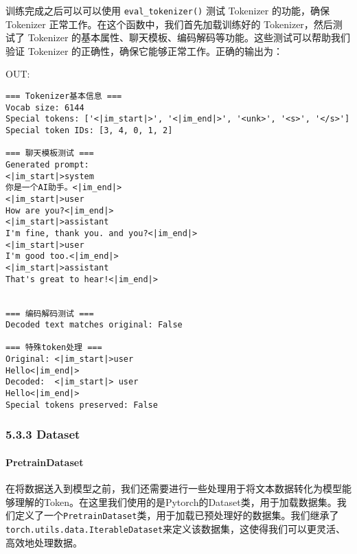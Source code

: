 \documentclass[12pt,a4paper]{book}
\begin{document}
训练完成之后可以可以使用 \texttt{eval\_tokenizer()} 测试 Tokenizer
的功能，确保 Tokenizer 正常工作。在这个函数中，我们首先加载训练好的
Tokenizer，然后测试了 Tokenizer
的基本属性、聊天模板、编码解码等功能。这些测试可以帮助我们验证 Tokenizer
的正确性，确保它能够正常工作。正确的输出为：

OUT:

\begin{verbatim}
=== Tokenizer基本信息 ===
Vocab size: 6144
Special tokens: ['<|im_start|>', '<|im_end|>', '<unk>', '<s>', '</s>']
Special token IDs: [3, 4, 0, 1, 2]

=== 聊天模板测试 ===
Generated prompt:
<|im_start|>system
你是一个AI助手。<|im_end|>
<|im_start|>user
How are you?<|im_end|>
<|im_start|>assistant
I'm fine, thank you. and you?<|im_end|>
<|im_start|>user
I'm good too.<|im_end|>
<|im_start|>assistant
That's great to hear!<|im_end|>


=== 编码解码测试 ===
Decoded text matches original: False

=== 特殊token处理 ===
Original: <|im_start|>user
Hello<|im_end|>
Decoded:  <|im_start|> user
Hello<|im_end|>
Special tokens preserved: False
\end{verbatim}

\subsubsection{5.3.3 Dataset}\label{dataset}

\paragraph{PretrainDataset}\label{pretraindataset}

在将数据送入到模型之前，我们还需要进行一些处理用于将文本数据转化为模型能够理解的Token。在这里我们使用的是Pytorch的Dataset类，用于加载数据集。我们定义了一个\texttt{PretrainDataset}类，用于加载已预处理好的数据集。我们继承了\texttt{torch.utils.data.IterableDataset}来定义该数据集，这使得我们可以更灵活、高效地处理数据。
\end{document}
